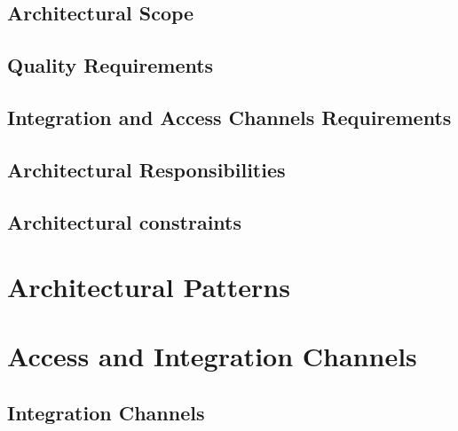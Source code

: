 \documentclass[a4paper,12pt]{article}
\begin{document}
		\subsection{Architectural Scope}
		

		\subsection{Quality Requirements}
		
			
		\subsection{Integration and Access Channels Requirements}
		
		
		\subsection{Architectural Responsibilities}
		
					
		\subsection{Architectural constraints}
		
	
	\section{Architectural Patterns}
	
	
	
	

	\section{Access and Integration Channels}
		\subsection{Integration Channels}
		
		
\end{document}
